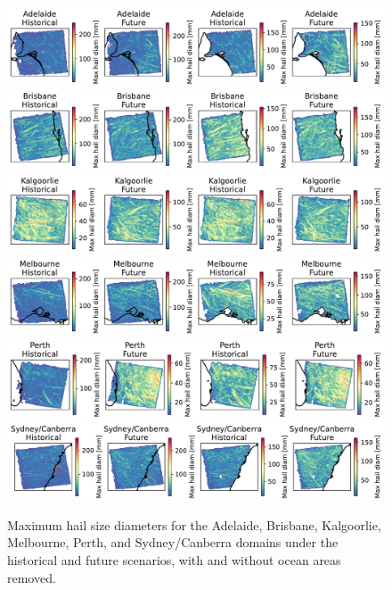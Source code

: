 \documentclass[draft,grl]{agutexSI2019}
\begin{document}
\begin{figure}[!ht]
    \includegraphics[width=\textwidth]{figures/maxes_Adelaide_hailcast_diam_max}
    \includegraphics[width=\textwidth]{figures/maxes_Brisbane_hailcast_diam_max}
    \includegraphics[width=\textwidth]{figures/maxes_Kalgoorlie_hailcast_diam_max}
    \includegraphics[width=\textwidth]{figures/maxes_Melbourne_hailcast_diam_max}
    \includegraphics[width=\textwidth]{figures/maxes_Perth_hailcast_diam_max}
    \includegraphics[width=\textwidth]{figures/maxes_Sydney_Canberra_hailcast_diam_max}
    \caption{Maximum hail size diameters for the Adelaide, Brisbane, Kalgoorlie, Melbourne, Perth, and Sydney/Canberra domains under the historical and future scenarios, with and without ocean areas removed.}
    \label{fig:maxes_with_removed_pts}
\end{figure}
\end{document}
